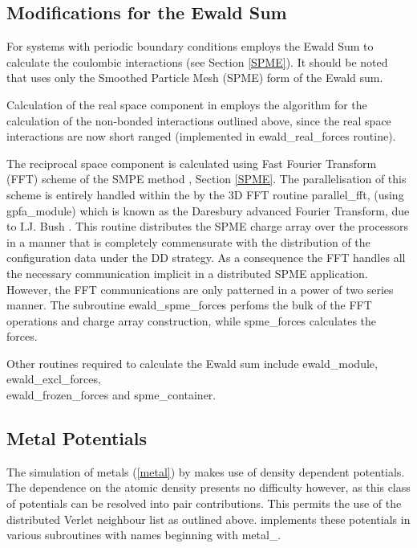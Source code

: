\subsection{Modifications for the Ewald Sum}

For systems with periodic boundary conditions \D employs the Ewald
Sum to calculate the coulombic interactions
(see Section \ref{SPME}).  It should be noted that \D uses only the
Smoothed Particle Mesh (SPME) form of the Ewald sum.

Calculation of the real space component in \D employs the
algorithm for the calculation of the non-bonded interactions
outlined above, since the real space interactions are now short
ranged (implemented in {\sc ewald\_real\_forces} routine).

The reciprocal space component is calculated using Fast Fourier
Transform (FFT) scheme of the SMPE method \cite{essmann-95a,bush-06a},
Section \ref{SPME}.  The parallelisation of this scheme is entirely
handled within the \D by the 3D FFT routine {\sc parallel\_fft},
(using {\sc gpfa\_module}) which is known as the Daresbury advanced
Fourier Transform, due to I.J. Bush \cite{bush-00a}.  This routine
distributes the SPME charge array over the processors in a manner
that is completely commensurate with the distribution of the
configuration data under the DD strategy.  As a consequence the
FFT handles all the necessary communication implicit in a
distributed SPME application.  However, the FFT communications
are only patterned in a power of two series manner.  The \D subroutine
{\sc ewald\_spme\_forces} perfoms the bulk of the FFT operations
and charge array construction, while {\sc spme\_forces} calculates the forces.

Other routines required to calculate the Ewald sum include {\sc ewald\_module}, \\
{\sc ewald\_excl\_forces}, \\ {\sc ewald\_frozen\_forces} and {\sc spme\_container}.

\subsection{Metal Potentials}

The simulation of metals (\ref{metal}) by \D makes use of density
dependent potentials.  The dependence on the atomic density presents
no difficulty however, as this class of potentials can be resolved
into pair contributions.  This permits the use of the distributed
Verlet neighbour list as
outlined above.  \D implements these potentials in various
subroutines with names beginning with {\sc metal\_}.

